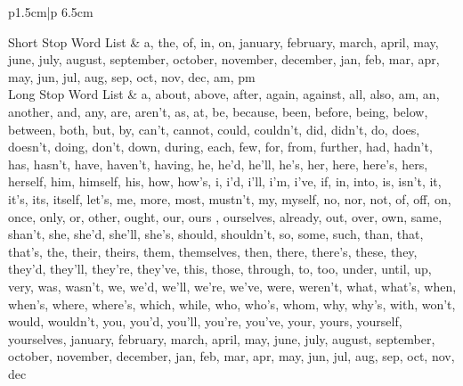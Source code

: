 \documentclass{sig-alternate}
\begin{document}
\begin{table}[h!t!]
\begin{center}
\begin{tabular}{p{1.5cm}|p {6.5cm}}

\hline

\hline
Short Stop Word List & a, the, of, in, on, january, february, march, april, may, june, july, august, september, october, november, december, jan, feb, mar, apr, may, jun, jul, aug, sep, oct, nov, dec, am, pm \\
\hline
Long Stop Word List & a, about, above, after, again, against, all, also, am, an, another, and, any, are, aren't, as, at, be, because, been, before, being, below, between, both, but, by, can't, cannot, could, couldn't, did, didn't, do, does, doesn't, doing, don't, down, during, each, few, for, from, further, had, hadn't, has, hasn't, have, haven't, having, he, he'd, he'll, he's, her, here, here's, hers, herself, him, himself, his, how, how's, i, i'd, i'll, i'm, i've, if, in, into, is, isn't, it, it's, its, itself, let's, me, more, most, mustn't, my, myself, no, nor, not, of, off, on, once, only, or, other, ought, our, ours , ourselves, already, out, over, own, same, shan't, she, she'd, she'll, she's, should, shouldn't, so, some, such, than, that, that's, the, their, theirs, them, themselves, then, there, there's, these, they, they'd, they'll, they're, they've, this, those, through, to, too, under, until, up, very, was, wasn't, we, we'd, we'll, we're, we've, were, weren't, what, what's, when, when's, where, where's, which, while, who, who's, whom, why, why's, with, won't, would, wouldn't, you, you'd, you'll, you're, you've, your, yours, yourself, yourselves, january, february, march, april, may, june, july, august, september, october, november, december, jan, feb, mar, apr, may, jun, jul, aug, sep, oct, nov, dec\\

\hline
\end{tabular}
\caption{Stop word list for blogs.}
\label{table:stopwords}
\end{center}
\end{table}
\end{document}
